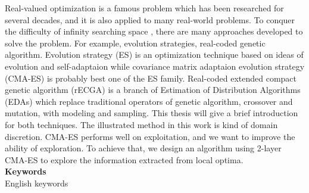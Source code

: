 \begin{abstractEN}

\setlength{\baselineskip}{1.5em}
Real-valued optimization is a famous problem which has been researched for several decades, and it is also applied to many real-world problems. To conquer the difficulty of infinity searching space , there are many approaches developed to solve the problem. For example, evolution strategies, real-coded genetic algorithm. Evolution strategy (ES) is an optimization technique based on ideas of evolution and self-adaptaion while covariance matrix adaptaion evolution strategy (CMA-ES) is probably best one of the ES family. Real-coded extended compact genetic algorithm (rECGA) is a branch of Estimation of Distribution Algorithms (EDAs) which replace traditional operators of genetic algorithm, crossover and mutation, with modeling and sampling. This thesis will give a brief introduction for both techniques. The illustrated method in this work is kind of domain discretion. CMA-ES performs well on exploitation, and we want to improve the ability of exploration. To achieve that, we design an algorithm using 2-layer CMA-ES to explore the information extracted from local optima.
\\

\noindent
\textbf{Keywords} \\
\noindent
English keywords

\end{abstractEN}
